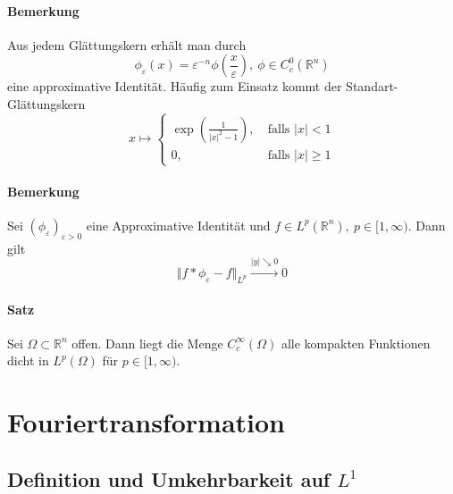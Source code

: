 \documentclass[12pt,a4paper,fleqn]{article}
\begin{document}
\paragraph{Bemerkung} Aus jedem Glättungskern erhält man durch
\begin{displaymath}
\phi_\varepsilon(x) = \varepsilon^{-n} \phi\left(\frac{x}{\varepsilon}\right),\ \phi \in C^0_c (\mathbb{R}^n)
\end{displaymath}
eine approximative Identität. Häufig zum Einsatz kommt der Standart-Glättungskern
\begin{displaymath}
x \mapsto \begin{cases}
 \exp \left(\frac{1}{\vert x \vert ^2- 1}\right),&\ \text{falls } \vert x \vert < 1 \\ 0,&\ \text{falls } \vert x \vert \geq 1
\end{cases}
\end{displaymath}

\paragraph{Bemerkung} Sei $(\phi_\varepsilon)_{\varepsilon > 0}$ eine Approximative Identität und $f \in L^p(\mathbb{R}^n),\ p \in [1, \infty)$. Dann gilt 
\begin{displaymath}
\Vert f * \phi_\varepsilon -f\Vert_{L^p } \xrightarrow{\vert y \vert \searrow 0} 0 
\end{displaymath}

\paragraph{Satz} Sei $\Omega \subset \mathbb{R}^n$ offen. Dann liegt die Menge $C^\infty_c (\Omega)$ alle kompakten Funktionen dicht in $L^p(\Omega)$ für $p \in [1, \infty)$.

\section{Fouriertransformation}

\subsection{Definition und Umkehrbarkeit auf $L^1$}
\end{document}
